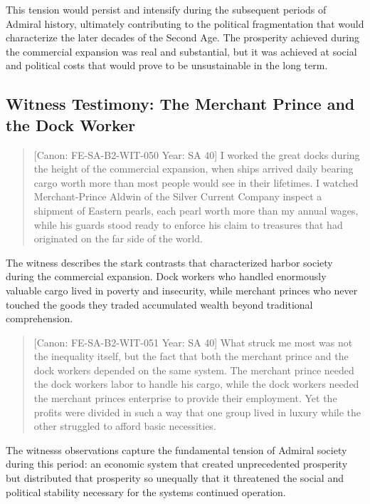 This tension would persist and intensify during the subsequent periods
of Admiral history, ultimately contributing to the political
fragmentation that would characterize the later decades of the Second
Age. The prosperity achieved during the commercial expansion was real
and substantial, but it was achieved at social and political costs that
would prove to be unsustainable in the long term.

\subsection{Witness Testimony: The Merchant Prince and the Dock
Worker}\label{witness-testimony-the-merchant-prince-and-the-dock-worker}

\begin{quote}
{[}Canon: FE-SA-B2-WIT-050 \textbar{} Year: SA 40{]} I worked the great
docks during the height of the commercial expansion, when ships arrived
daily bearing cargo worth more than most people would see in their
lifetimes. I watched Merchant-Prince Aldwin of the Silver Current
Company inspect a shipment of Eastern pearls, each pearl worth more than
my annual wages, while his guards stood ready to enforce his claim to
treasures that had originated on the far side of the world.
\end{quote}

The witness describes the stark contrasts that characterized harbor
society during the commercial expansion. Dock workers who handled
enormously valuable cargo lived in poverty and insecurity, while
merchant princes who never touched the goods they traded accumulated
wealth beyond traditional comprehension.

\begin{quote}
{[}Canon: FE-SA-B2-WIT-051 \textbar{} Year: SA 40{]} What struck me most
was not the inequality itself, but the fact that both the merchant
prince and the dock workers depended on the same system. The merchant
prince needed the dock workers\textquotesingle{} labor to handle his
cargo, while the dock workers needed the merchant
prince\textquotesingle s enterprise to provide their employment. Yet the
profits were divided in such a way that one group lived in luxury while
the other struggled to afford basic necessities.
\end{quote}

The witness\textquotesingle s observations capture the fundamental
tension of Admiral society during this period: an economic system that
created unprecedented prosperity but distributed that prosperity so
unequally that it threatened the social and political stability
necessary for the system\textquotesingle s continued operation.

